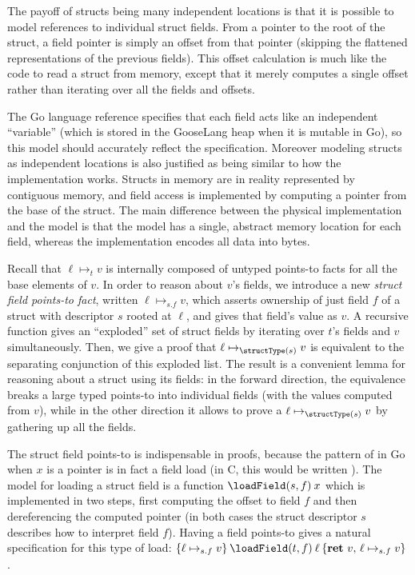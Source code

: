 The payoff of structs being many independent locations is that it is
possible to model references to individual struct fields. From a pointer
to the root of the struct, a field pointer is simply an offset from that
pointer (skipping the flattened representations of the previous fields).
This offset calculation is much like the code to read a struct from
memory, except that it merely computes a single offset rather than
iterating over all the fields and offsets.

The Go language reference specifies that each field acts like an
independent ``variable'' (which is stored in the GooseLang heap when it
is mutable in Go), so this model should accurately reflect the
specification. Moreover modeling structs as independent locations is
also justified as being similar to how the implementation works. Structs
in memory are in reality represented by contiguous memory, and field
access is implemented by computing a pointer from the base of the
struct. The main difference between the physical implementation and the
model is that the model has a single, abstract memory location for each field,
whereas the implementation encodes all data into bytes.

Recall that $\ell \mapsto_t v$ is internally composed of untyped
points-to facts for all the base elements of $v$. In order to reason
about $v$'s fields, we introduce a new \emph{struct field points-to fact},
written $\ell \mapsto_{s.f} v$, which asserts ownership of just field
$f$ of a struct with descriptor $s$ rooted at $\ell$, and gives that field's
value as $v$. A recursive function gives an ``exploded'' set of struct
fields by iterating over $t$'s fields and $v$ simultaneously. Then,
we give a proof that $\ell \mapsto_{\structType(s)} v$ is equivalent to the separating
conjunction of this exploded list. The result is a convenient lemma for
reasoning about a struct using its fields: in the forward direction, the
equivalence breaks a large typed points-to into individual fields (with
the values computed from $v$), while in the other direction it allows
to prove a $\ell \mapsto_{\structType(s)} v$ by gathering up all the fields.

The struct field points-to is indispensable in proofs, because the
pattern of  in Go when $x$ is a pointer is in fact a field
load (in C, this would be written ). The model
for loading a struct field is a function $\loadField(s, f) \app x$
which is implemented in two steps, first computing the offset to field
$f$ and then dereferencing the computed pointer (in both cases the struct descriptor $s$
describes how to interpret field $f$). Having a field points-to gives
a natural specification for this type of load:
$\hoare{\ell \mapsto_{s.f} v}{\loadField(t, f) \app \ell}{\Ret{v} \ell \mapsto_{s.f} v}$.

